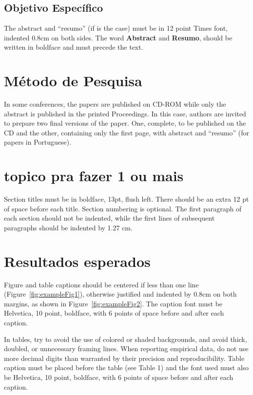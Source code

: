 \documentclass[12pt]{article}
\begin{document}
\subsection{Objetivo Específico}
The abstract and ``resumo'' (if is the case) must be in 12 point Times font,
indented 0.8cm on both sides. The word \textbf{Abstract} and \textbf{Resumo},
should be written in boldface and must precede the text.

\section{Método de Pesquisa}

In some conferences, the papers are published on CD-ROM while only the
abstract is published in the printed Proceedings. In this case, authors are
invited to prepare two final versions of the paper. One, complete, to be
published on the CD and the other, containing only the first page, with
abstract and ``resumo'' (for papers in Portuguese).

\section{topico pra fazer 1 ou mais}

Section titles must be in boldface, 13pt, flush left. There should be an extra
12 pt of space before each title. Section numbering is optional. The first
paragraph of each section should not be indented, while the first lines of
subsequent paragraphs should be indented by 1.27 cm.

\section{Resultados esperados}

Figure and table captions should be centered if less than one line
(Figure~\ref{fig:exampleFig1}), otherwise justified and indented by 0.8cm on
both margins, as shown in Figure~\ref{fig:exampleFig2}. The caption font must
be Helvetica, 10 point, boldface, with 6 points of space before and after each
caption.

In tables, try to avoid the use of colored or shaded backgrounds, and avoid
thick, doubled, or unnecessary framing lines. When reporting empirical data,
do not use more decimal digits than warranted by their precision and
reproducibility. Table caption must be placed before the table (see Table 1)
and the font used must also be Helvetica, 10 point, boldface, with 6 points of
space before and after each caption.
\end{document}
